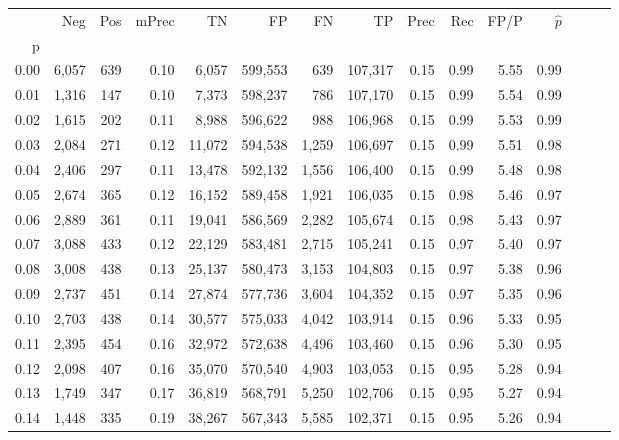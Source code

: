 \begin{tabular}{rrrrrrrrrrrrrrr}
\toprule
{} &     Neg &     Pos & mPrec &       TN &       FP &       FN &       TP &  Prec &   Rec &  FP/P & $\hat{p}$ \\
p    &         &         &       &          &          &          &          &       &       &       &           \\
\midrule
0.00 &   6,057 &     639 &  0.10 &    6,057 &  599,553 &      639 &  107,317 &  0.15 &  0.99 &  5.55 &      0.99 \\
0.01 &   1,316 &     147 &  0.10 &    7,373 &  598,237 &      786 &  107,170 &  0.15 &  0.99 &  5.54 &      0.99 \\
0.02 &   1,615 &     202 &  0.11 &    8,988 &  596,622 &      988 &  106,968 &  0.15 &  0.99 &  5.53 &      0.99 \\
0.03 &   2,084 &     271 &  0.12 &   11,072 &  594,538 &    1,259 &  106,697 &  0.15 &  0.99 &  5.51 &      0.98 \\
0.04 &   2,406 &     297 &  0.11 &   13,478 &  592,132 &    1,556 &  106,400 &  0.15 &  0.99 &  5.48 &      0.98 \\
0.05 &   2,674 &     365 &  0.12 &   16,152 &  589,458 &    1,921 &  106,035 &  0.15 &  0.98 &  5.46 &      0.97 \\
0.06 &   2,889 &     361 &  0.11 &   19,041 &  586,569 &    2,282 &  105,674 &  0.15 &  0.98 &  5.43 &      0.97 \\
0.07 &   3,088 &     433 &  0.12 &   22,129 &  583,481 &    2,715 &  105,241 &  0.15 &  0.97 &  5.40 &      0.97 \\
0.08 &   3,008 &     438 &  0.13 &   25,137 &  580,473 &    3,153 &  104,803 &  0.15 &  0.97 &  5.38 &      0.96 \\
0.09 &   2,737 &     451 &  0.14 &   27,874 &  577,736 &    3,604 &  104,352 &  0.15 &  0.97 &  5.35 &      0.96 \\
0.10 &   2,703 &     438 &  0.14 &   30,577 &  575,033 &    4,042 &  103,914 &  0.15 &  0.96 &  5.33 &      0.95 \\
0.11 &   2,395 &     454 &  0.16 &   32,972 &  572,638 &    4,496 &  103,460 &  0.15 &  0.96 &  5.30 &      0.95 \\
0.12 &   2,098 &     407 &  0.16 &   35,070 &  570,540 &    4,903 &  103,053 &  0.15 &  0.95 &  5.28 &      0.94 \\
0.13 &   1,749 &     347 &  0.17 &   36,819 &  568,791 &    5,250 &  102,706 &  0.15 &  0.95 &  5.27 &      0.94 \\
0.14 &   1,448 &     335 &  0.19 &   38,267 &  567,343 &    5,585 &  102,371 &  0.15 &  0.95 &  5.26 &      0.94 \\

\end{tabular}
